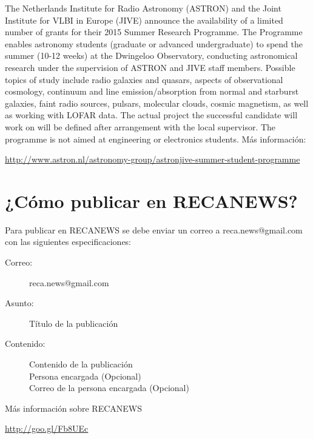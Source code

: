\documentclass{book}
\begin{document}
The Netherlands Institute for Radio Astronomy (ASTRON) and the Joint Institute for VLBI in Europe (JIVE) announce the availability of a limited number of grants for their 2015 Summer Research Programme. The Programme enables astronomy students (graduate or advanced undergraduate) to spend the summer (10-12 weeks) at the Dwingeloo Observatory, conducting astronomical research under the supervision of ASTRON and JIVE staff members. Possible topics of study include radio galaxies and quasars, aspects of observational cosmology, continuum and line emission/absorption from normal and starburst galaxies, faint radio sources, pulsars, molecular clouds, cosmic magnetism, as well as working with LOFAR data. The actual project the successful candidate will work on will be defined after arrangement with the local supervisor. The programme is not aimed at engineering or electronics students.
\noindent Más información: \begin{center}
\url{http://www.astron.nl/astronomy-group/astronjive-summer-student-programme}
\end{center}


 \section*{¿Cómo publicar en RECANEWS?}

Para publicar en RECANEWS se debe enviar un correo a reca.news@gmail.com con las siguientes especificaciones:
\begin{description}
\item[Correo:]reca.news@gmail.com
\item[Asunto:]Título de la publicación
\item[Contenido:]Contenido de la publicación\\
Persona encargada (Opcional)\\
Correo de la persona encargada (Opcional)
\end{description}
    
\noindent Más información sobre RECANEWS

\begin{center}
\url{http://goo.gl/Fb8UEc}
\end{center}


\end{document}
